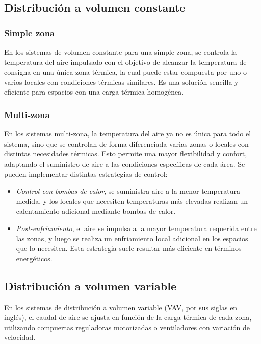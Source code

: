 \subsection{Distribución a volumen constante}

\subsubsection{Simple zona}
En los sistemas de volumen constante para una simple zona, se controla la temperatura del aire impulsado con el objetivo de alcanzar la temperatura de consigna en una única zona térmica, la cual puede estar compuesta por uno o varios locales con condiciones térmicas similares. Es una solución sencilla y eficiente para espacios con una carga térmica homogénea.

\subsubsection{Multi-zona}
En los sistemas multi-zona, la temperatura del aire ya no es única para todo el sistema, sino que se controlan de forma diferenciada varias zonas o locales con distintas necesidades térmicas. Esto permite una mayor flexibilidad y confort, adaptando el suministro de aire a las condiciones específicas de cada área. Se pueden implementar distintas estrategias de control:
\begin{itemize}
	\item \emph{Control con bombas de calor}, se suministra aire a la menor temperatura medida, y los locales que necesiten temperaturas más elevadas realizan un calentamiento adicional mediante bombas de calor.
	\item \emph{Post-enfriamiento}, el aire se impulsa a la mayor temperatura requerida entre las zonas, y luego se realiza un enfriamiento local adicional en los espacios que lo necesiten. Esta estrategia suele resultar más eficiente en términos energéticos.
\end{itemize}


\subsection{Distribución a volumen variable}

En los sistemas de distribución a volumen variable (VAV, por sus siglas en inglés), el caudal de aire se ajusta en función de la carga térmica de cada zona, utilizando compuertas reguladoras motorizadas o ventiladores con variación de velocidad.

